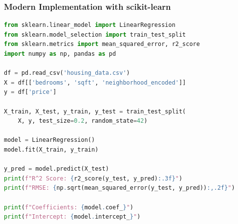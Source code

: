 \begin{frame}[fragile]\frametitle{Modern Implementation with scikit-learn}
\begin{lstlisting}[language=Python]
from sklearn.linear_model import LinearRegression
from sklearn.model_selection import train_test_split
from sklearn.metrics import mean_squared_error, r2_score
import numpy as np, pandas as pd

df = pd.read_csv('housing_data.csv')
X = df[['bedrooms', 'sqft', 'neighborhood_encoded']]
y = df['price']

X_train, X_test, y_train, y_test = train_test_split(
    X, y, test_size=0.2, random_state=42)

model = LinearRegression()
model.fit(X_train, y_train)

y_pred = model.predict(X_test)
print(f"R^2 Score: {r2_score(y_test, y_pred):.3f}")
print(f"RMSE: {np.sqrt(mean_squared_error(y_test, y_pred)):,.2f}")

print(f"Coefficients: {model.coef_}")
print(f"Intercept: {model.intercept_}")
\end{lstlisting}
\end{frame}






